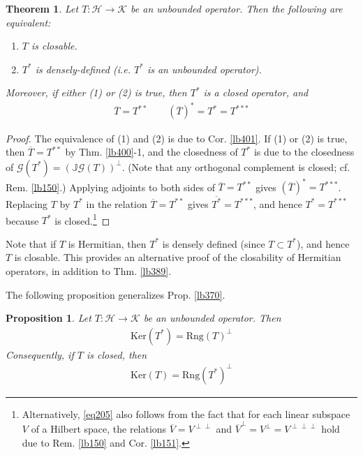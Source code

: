 \documentclass[12pt,b5paper,notitlepage]{article}
\theoremstyle{definition}
\theoremstyle{plain}
\newtheorem{thm}[df]{Theorem}
\newtheorem{pp}[df]{Proposition}
\newcommand{\ovl}{\overline}
\newcommand{\Jbb}{\mathbb J}
\newcommand{\Ker}{\mathrm{Ker}}
\newcommand{\Rng}{\mathrm{Rng}}
\newcommand{\MH}{\mathcal H}
\newcommand{\MK}{\mathcal K}
\newcommand{\SG}{\mathscr G}
\numberwithin{equation}{section}
\begin{document}
\begin{thm}\label{lb402}
Let $T:\MH\rightarrow\MK$ be an unbounded operator. Then the following are equivalent:
\begin{enumerate}
\item[(1)] $T$ is closable.
\item[(2)] $T^*$ is densely-defined (i.e. $T^*$ is an unbounded operator).
\end{enumerate}
Moreover, if either (1) or (2) is true, then $T^*$ is a closed operator, and 
\begin{align}\label{eq205}
\ovl T=T^{**}\qquad (\ovl T)^*=T^*=T^{***}
\end{align}
\end{thm}



\begin{proof}
The equivalence of (1) and (2) is due to Cor. \ref{lb401}. If (1) or (2) is true, then $\ovl T=T^{**}$ by Thm. \ref{lb400}-1, and the closedness of $T^*$ is due to the closedness of $\SG(T^*)=(\Jbb\SG(T))^\perp$. (Note that any orthogonal complement is closed; cf. Rem. \ref{lb150}.) Applying adjoints to both sides of $\ovl T=T^{**}$ gives $(\ovl T)^*=T^{***}$. Replacing $T$ by $T^*$ in the relation $\ovl T=T^{**}$ gives $\ovl{T^*}=T^{***}$, and hence $T^*=T^{***}$ because $T^*$ is closed.\footnote{Alternatively, \eqref{eq205} also follows from the fact that for each linear subspace $V$ of a Hilbert space, the relations $\ovl V=V^{\perp\perp}$ and $\ovl V^\perp=V^\perp=V^{\perp\perp\perp}$ hold due to Rem. \ref{lb150} and Cor. \ref{lb151}.}
\end{proof}


Note that if $T$ is Hermitian, then $T^*$ is densely defined (since $T\subset T^*$), and hence $T$ is closable. This provides an alternative proof of the closability of Hermitian operators, in addition to Thm. \ref{lb389}.



The following proposition generalizes Prop. \ref{lb370}.


\begin{pp}\label{lb403}
Let $T:\MH\rightarrow\MK$ be an unbounded operator. Then
\begin{align}
\Ker(T^*)=\Rng(T)^\perp
\end{align}
Consequently, if $T$ is closed, then
\begin{align}
\Ker(T)=\Rng(T^*)^\perp
\end{align}
\end{pp}
\end{document}
